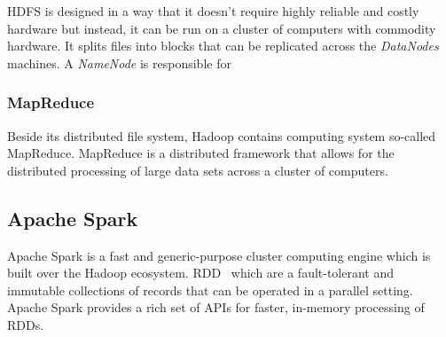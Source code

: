\gls{HDFS} is designed in a way that it doesn't require highly reliable and costly hardware but instead, it can be run on a cluster of computers with commodity hardware.
It splits files into blocks that can be replicated across the \textit{DataNodes} machines.
A \textit{NameNode} is responsible for 


\subsubsection{MapReduce}
Beside its distributed file system, Hadoop contains computing system so-called MapReduce.
MapReduce is a distributed framework that allows for the distributed processing of large data sets across a cluster of computers.  


\subsection{Apache Spark}
Apache Spark is a fast and generic-purpose cluster computing engine which is built over the Hadoop ecosystem.
\gls{RDD}~\cite{zaharia2012resilient} which are a fault-tolerant and immutable collections of records that can be operated in a parallel setting.
Apache Spark provides a rich set of APIs for faster, in-memory processing of RDDs. 